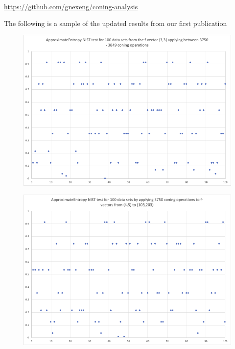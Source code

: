 \documentclass[oneside,12pt]{amsart}
\theoremstyle{definition}
\numberwithin{equation}{section}
\begin{document}
\vspace{.5cm}

\begin{center}
\url{https://github.com/gnexeng/coning-analysis}
\end{center}

\vspace{.5cm}

The following is a sample of the updated results from our first publication~\cite{ALDH}

\begin{figure}[h!]
\centering
\includegraphics[scale=.5]{./charts/ApproximateEntropy_3_3.png}
\label{fig:approxentropy33}
\end{figure}

\begin{figure}[h!]
\centering
\includegraphics[scale=.5]{./charts/ApproximateEntropy_4_5.png}
\label{fig:approxentropy45}
\end{figure}
\end{document}
